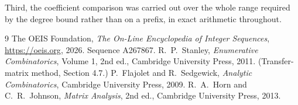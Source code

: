 \documentclass[11pt,a4paper]{article}
\theoremstyle{plain}
\theoremstyle{definition}
\begin{document}
Third, the coefficient comparison was carried out over the whole range required by the degree
bound rather than on a prefix, in exact arithmetic throughout.

\begin{thebibliography}{9}
 The OEIS Foundation, \emph{The On-Line Encyclopedia of Integer
Sequences}, \url{https://oeis.org}, 2026. Sequence A267867.
 R.~P.~Stanley, \emph{Enumerative Combinatorics}, Volume 1, 2nd ed.,
Cambridge University Press, 2011. (Transfer-matrix method, Section 4.7.)
 P.~Flajolet and R.~Sedgewick, \emph{Analytic Combinatorics}, Cambridge
University Press, 2009.
 R.~A.~Horn and C.~R.~Johnson, \emph{Matrix Analysis}, 2nd ed., Cambridge
University Press, 2013.
\end{thebibliography}
\end{document}
